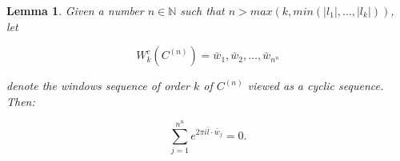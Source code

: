 \documentclass[11pt,a4paper]{tesis}
\theoremstyle{plain}
\newtheorem{lemma}[theorem]{Lemma}
\theoremstyle{definition}
\begin{document}
\begin{lemma}\label{lemma:weyl-sum-over-cyclic-c-sequences}
  Given a number $n \in \mathbb{N}$ such that $n > max\left(k, min\left(|l_1|, \dots, |l_k|\right)\right)$, let

  \begin{equation*}
    W_k^c\left(C^{(n)}\right) = \bar{w}_1, \bar{w}_2, \dots, \bar{w}_{n^n}
  \end{equation*}
  
  denote the windows sequence of order $k$ of $C^{(n)}$ viewed as a cyclic sequence. Then:

  \begin{equation}\label{equation:weyl-sum-over-cyclic-c-sequence}
    \sum_{j = 1}^{n^n} e^{2 \pi i \bar{l} \cdot \bar{w}_j} = 0 \text{.}
  \end{equation}
\end{lemma}
\end{document}
